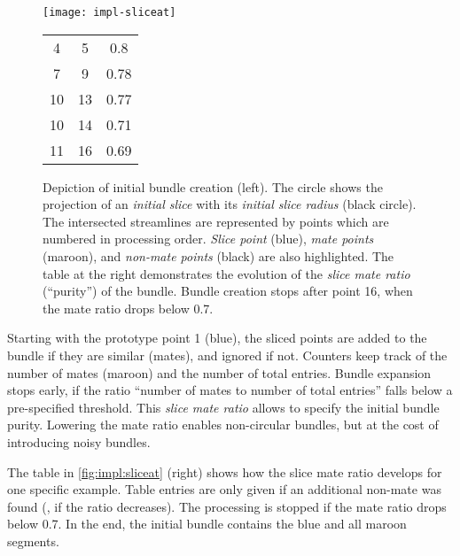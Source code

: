 \begin{figure}[bhtp]
  \centering
  \begin{minipage}[c]{0.47\textwidth}
    \centering
		\texttt{[image: impl-sliceat]}
  \end{minipage}
  \begin{minipage}[c]{0.47\textwidth}
  	\centering
		\begin{tabular}{ccc} 
			\toprule
			\tableheadline{Mate} & \tableheadline{Total} & \tableheadline{Ratio} \\
			\midrule
			\num{4} & \num{5} & \num{0.8} \\
			\num{7} & \num{9} & \num{0.78} \\
			\num{10} & \num{13} & \num{0.77} \\
			\num{10} & \num{14} & \num{0.71} \\
			\num{11} & \num{16} & \num{0.69} \\
		\end{tabular}
  \end{minipage}
	\caption[Illustration of .]{Depiction of initial bundle creation (left). The circle shows the \twod projection of an \emph{initial slice} with its \emph{initial slice radius} (black circle). The intersected streamlines are represented by points which are numbered in processing order. \emph{Slice point} (blue), \emph{mate points} (maroon), and \emph{non-mate points} (black) are also highlighted. The table at the right demonstrates the evolution of the \emph{slice mate ratio} (``purity'') of the bundle. Bundle creation stops after point \num{16}, when the mate ratio drops below \num{0.7}.}
	\label{fig:impl:sliceat}
\end{figure}

Starting with the prototype point \num{1} (blue), the sliced points are added to the bundle if they are similar (mates), and ignored if not. Counters keep track of the number of mates (maroon) and the number of total entries. Bundle expansion stops early, if the ratio ``number of mates to number of total entries'' falls below a pre-specified threshold. This \emph{slice mate ratio} allows to specify the initial bundle purity. Lowering the mate ratio enables non-circular bundles, but at the cost of introducing noisy bundles.

The table in \autoref{fig:impl:sliceat} (right) shows how the slice mate ratio develops for one specific example. Table entries are only given if an additional non-mate was found (\ie, if the ratio decreases). The processing is stopped if the mate ratio drops below \num{0.7}. In the end, the initial bundle contains the blue and all maroon segments.

